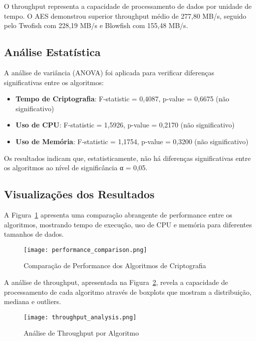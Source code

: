 \documentclass[12pt,a4paper,oneside]{article}
\begin{document}
O throughput representa a capacidade de processamento de dados por unidade de tempo. O AES demonstrou superior throughput médio de 277,80 MB/s, seguido pelo Twofish com 228,19 MB/s e Blowfish com 155,48 MB/s.

\subsection{Análise Estatística}

A análise de variância (ANOVA) foi aplicada para verificar diferenças significativas entre os algoritmos:

\begin{itemize}
    \item \textbf{Tempo de Criptografia}: F-statistic = 0,4087, p-value = 0,6675 (não significativo)
    \item \textbf{Uso de CPU}: F-statistic = 1,5926, p-value = 0,2170 (não significativo)
    \item \textbf{Uso de Memória}: F-statistic = 1,1754, p-value = 0,3200 (não significativo)
\end{itemize}

Os resultados indicam que, estatisticamente, não há diferenças significativas entre os algoritmos ao nível de significância α = 0,05.

\subsection{Visualizações dos Resultados}

A Figura~\ref{fig:performance} apresenta uma comparação abrangente de performance entre os algoritmos, mostrando tempo de execução, uso de CPU e memória para diferentes tamanhos de dados.

\begin{figure}[H]
\centering
\texttt{[image: performance\_comparison.png]}
\caption{Comparação de Performance dos Algoritmos de Criptografia}
\label{fig:performance}
\end{figure}

A análise de throughput, apresentada na Figura~\ref{fig:throughput}, revela a capacidade de processamento de cada algoritmo através de boxplots que mostram a distribuição, mediana e outliers.

\begin{figure}[H]
\centering
\texttt{[image: throughput\_analysis.png]}
\caption{Análise de Throughput por Algoritmo}
\label{fig:throughput}
\end{figure}
\end{document}
